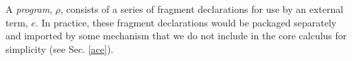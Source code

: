 
A \emph{program}, $\rho$, consists of a series of fragment declarations for use by an external term, $e$. In practice, these fragment declarations would be packaged separately and imported by some mechanism that we do not include in the core calculus for simplicity (see Sec. \ref{ace}).

